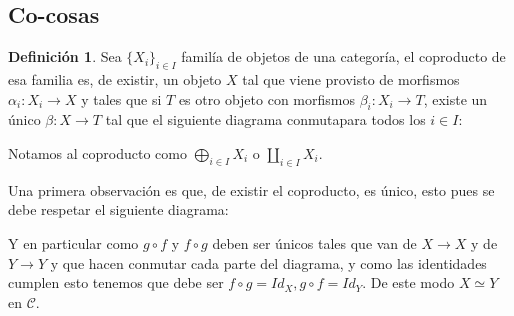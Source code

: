 \documentclass{article}
\newcommand{\flia}[1]{\{ #1_i\}_{i \in I}}
\theoremstyle{plain}
\theoremstyle{definition}
\newtheorem{definition}[theorem]{Definición}
\theoremstyle{remark}
\begin{document}
\subsection{Co-cosas}

\begin{definition}
    Sea $\flia{X}$ familía de objetos de una categoría, el coproducto de esa familia es, de existir, un objeto $X$ tal que viene provisto de morfismos $\alpha_i: X_i \to X$ y tales que si $T$ es otro objeto con morfismos $\beta_i:X_i \to T$, existe un único $\beta:X \to T$ tal que el siguiente diagrama conmutapara todos los $i \in I$:

  
    \begin{center}
    \end{center}

    Notamos al coproducto como $\bigoplus_{i \in I} X_i$ o $\coprod_{i \in I} X_i$.
\end{definition}

Una primera observación es que, de existir el coproducto, es único, esto pues se debe respetar el siguiente diagrama:

\begin{center}
\end{center}

Y en particular como $g \circ f$ y $f \circ g$ deben ser únicos tales que van de $X \to X$ y de $Y \to Y$ y que hacen conmutar cada parte del diagrama, y como las identidades cumplen esto tenemos que debe ser $f \circ g = Id_X, g \circ f = Id_Y$. De este modo $X \simeq Y$ en $\mathcal{C}$. \\
\end{document}
